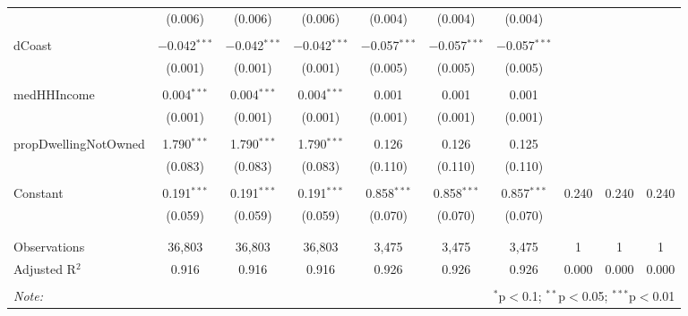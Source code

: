 \documentclass{article}
\begin{document}
\begin{table}[!htbp]
\begin{tabular}{@{\extracolsep{5pt}}lccccccccc}
  & (0.006) & (0.006) & (0.006) & (0.004) & (0.004) & (0.004) &  &  &  \\ 
  & & & & & & & & & \\ 
 dCoast & $-$0.042$^{***}$ & $-$0.042$^{***}$ & $-$0.042$^{***}$ & $-$0.057$^{***}$ & $-$0.057$^{***}$ & $-$0.057$^{***}$ &  &  &  \\ 
  & (0.001) & (0.001) & (0.001) & (0.005) & (0.005) & (0.005) &  &  &  \\ 
  & & & & & & & & & \\ 
 medHHIncome & 0.004$^{***}$ & 0.004$^{***}$ & 0.004$^{***}$ & 0.001 & 0.001 & 0.001 &  &  &  \\ 
  & (0.001) & (0.001) & (0.001) & (0.001) & (0.001) & (0.001) &  &  &  \\ 
  & & & & & & & & & \\ 
 propDwellingNotOwned & 1.790$^{***}$ & 1.790$^{***}$ & 1.790$^{***}$ & 0.126 & 0.126 & 0.125 &  &  &  \\ 
  & (0.083) & (0.083) & (0.083) & (0.110) & (0.110) & (0.110) &  &  &  \\ 
  & & & & & & & & & \\ 
 Constant & 0.191$^{***}$ & 0.191$^{***}$ & 0.191$^{***}$ & 0.858$^{***}$ & 0.858$^{***}$ & 0.857$^{***}$ & 0.240 & 0.240 & 0.240 \\ 
  & (0.059) & (0.059) & (0.059) & (0.070) & (0.070) & (0.070) &  &  &  \\ 
  & & & & & & & & & \\ 
\hline \\[-1.8ex] 
Observations & 36,803 & 36,803 & 36,803 & 3,475 & 3,475 & 3,475 & 1 & 1 & 1 \\ 
Adjusted R$^{2}$ & 0.916 & 0.916 & 0.916 & 0.926 & 0.926 & 0.926 & 0.000 & 0.000 & 0.000 \\ 
\hline 
\hline \\[-1.8ex] 
\textit{Note:}  & \multicolumn{9}{r}{$^{*}$p$<$0.1; $^{**}$p$<$0.05; $^{***}$p$<$0.01} \\ 
\end{tabular} 
\end{table} 
\end{document}
